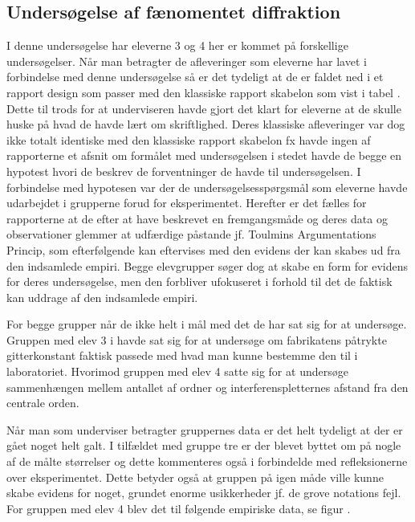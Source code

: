 \subsection*{Undersøgelse af fænomentet diffraktion}
I denne undersøgelse har eleverne 3 og 4 her er kommet på forskellige undersøgelser. Når man betragter de afleveringer som eleverne har lavet i forbindelse med denne undersøgelse så er det tydeligt at de er faldet ned i et rapport design som passer med den klassiske rapport skabelon som vist i tabel . Dette til trods for at underviseren havde gjort det klart for eleverne at de skulle huske på hvad de havde lært om skriftlighed. Deres klassiske afleveringer var dog ikke totalt identiske med den klassiske rapport skabelon fx havde ingen af rapporterne et afsnit om formålet med undersøgelsen i stedet havde de begge en hypotest hvori de beskrev de forventninger de havde til undersøgelsen. I forbindelse med hypotesen var der de undersøgelsesspørgsmål som eleverne havde udarbejdet i grupperne forud for eksperimentet. Herefter er det fælles for rapporterne at de efter at have beskrevet en fremgangsmåde og deres data og observationer glemmer at udfærdige påstande jf. Toulmins Argumentations Princip, som efterfølgende kan eftervises med den evidens der kan skabes ud fra den indsamlede empiri. Begge elevgrupper søger dog at skabe en form for evidens for deres undersøgelse, men den forbliver ufokuseret i forhold til det de faktisk kan uddrage af den indsamlede empiri.

For begge grupper når de ikke helt i mål med det de har sat sig for at undersøge. Gruppen med elev 3 i havde sat sig for at undersøge om fabrikatens påtrykte gitterkonstant faktisk passede med hvad man kunne bestemme den til i laboratoriet. Hvorimod gruppen med elev 4 satte sig for at undersøge sammenhængen mellem antallet af ordner og interferenspletternes afstand fra den centrale orden. 

Når man som underviser betragter gruppernes data er det helt tydeligt at der er gået noget helt galt. I tilfældet med gruppe tre er der blevet byttet om på nogle af de målte størrelser og dette kommenteres også i forbindelde med refleksionerne over eksperimentet. Dette betyder også at gruppen på igen måde ville kunne skabe evidens for noget, grundet enorme usikkerheder jf. de grove notations fejl. For gruppen med elev 4 blev det til følgende empiriske data, se figur .

